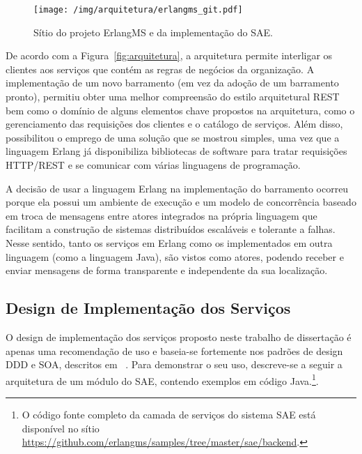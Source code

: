 \begin{figure}[htb]
\texttt{[image: /img/arquitetura/erlangms\_git.pdf]}
\caption{Sítio do projeto ErlangMS e da implementação do SAE.}
\label{fig:erlangms_git}
\end{figure}
\FloatBarrier



De acordo com a Figura~\ref{fig:arquitetura}, a arquitetura permite interligar os clientes aos serviços que contém as regras de negócios da organização. A implementa\c c\~{a}o de um novo 
barramento (em vez da ado\c c\~{a}o de um barramento pronto), permitiu obter
uma melhor compreens\~{a}o do estilo arquitetural \acrshort{REST} bem como o dom\'{i}nio de alguns 
elementos chave propostos na arquitetura, como o gerenciamento das requisições dos clientes e o catálogo de serviços. Além disso, possibilitou o emprego de uma solução que se mostrou simples, uma vez que a linguagem Erlang já disponibiliza bibliotecas de software para tratar requisições HTTP/REST e se comunicar com várias linguagens de programação.



A decisão de usar a linguagem Erlang na implementação do barramento 
ocorreu porque ela possui um ambiente de execução e um modelo de concorrência 
baseado em troca de mensagens entre atores integrados na própria linguagem que facilitam 
a construção de sistemas distribuídos escaláveis e tolerante a falhas. Nesse sentido, tanto os serviços em Erlang como os implementados em outra linguagem (como a linguagem Java), são vistos como atores, podendo receber e enviar mensagens de forma transparente e independente da sua localização.


\subsection{Design de Implementação dos Serviços}\label{design_implementacao}


O design de implementação dos serviços
proposto neste trabalho de dissertação é apenas uma recomendação de uso e
baseia-se fortemente 
nos padrões de design \acrshort{DDD} e \acrshort{SOA},
descritos em
~\cite{avram2007domain, evans2004domain, fowler2002patterns, krafzig2004service, SOA_patterns_2012}.
Para demonstrar o seu uso,
descreve-se a seguir 
a arquitetura de um módulo do \acrshort{SAE},
contendo
exemplos em código Java.\footnote{O código fonte completo 
da camada de serviços do sistema \acrshort{SAE} está disponível
no sítio \url{https://github.com/erlangms/samples/tree/master/sae/backend}.}.

